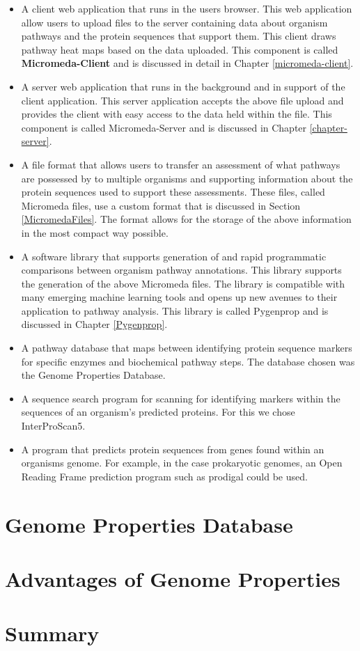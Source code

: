 \begin{itemize}
\item A client web application that runs in the users browser. This web application allow users to upload files to the server containing data about organism pathways and the protein sequences that support them. This client draws pathway heat maps based on the data uploaded.  This component is called \textbf{Micromeda-Client} and is discussed in detail in Chapter \ref{micromeda-client}.
\item A server web application that runs in the background and in support of the client application. This server application accepts the above file upload and provides the client with easy access to the data held within the file. This component is called Micromeda-Server and is discussed in Chapter \ref{chapter-server}.
\item A file format that allows users to transfer an assessment of what pathways are possessed by to multiple organisms and supporting information about the protein sequences used to support these assessments. These files, called Micromeda files, use a custom format that is discussed in Section \ref{MicromedaFiles}. The format allows for the storage of the above information in the most compact way possible.
\item A software library that supports generation of and rapid programmatic comparisons between organism pathway annotations. This library supports the generation of the above Micromeda files. The library is compatible with many emerging machine learning tools and opens up new avenues to their application to pathway analysis. This library is called Pygenprop and is discussed in Chapter \ref{Pygenprop}.
\item A pathway database that maps between identifying protein sequence markers for specific enzymes and biochemical pathway steps. The database chosen was the Genome Properties Database.
\item A sequence search program for scanning for identifying markers within the sequences of an organism's predicted proteins. For this we chose InterProScan5.
\item A program that predicts protein sequences from genes found within an organisms genome. For example, in the case prokaryotic genomes, an Open Reading Frame prediction program such as prodigal could be used. 
\end{itemize}

\section{Genome Properties Database}











\section{Advantages of Genome Properties}



\section{Summary}